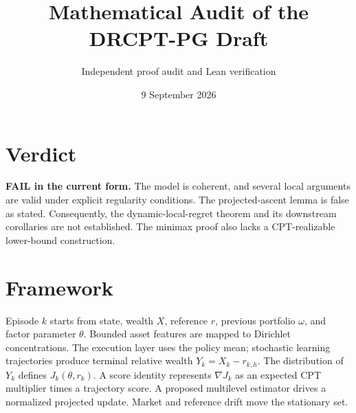 \documentclass[11pt]{article}
\title{Mathematical Audit of the DRCPT-PG Draft}
\author{Independent proof audit and Lean verification}
\date{9 September 2026}
\begin{document}
\maketitle

\section*{Verdict}
\textcolor{fatal}{\textbf{FAIL in the current form.}}
The model is coherent, and several local arguments are valid under explicit regularity conditions. The projected-ascent lemma is false as stated. Consequently, the dynamic-local-regret theorem and its downstream corollaries are not established. The minimax proof also lacks a CPT-realizable lower-bound construction.

\section*{Framework}
Episode $k$ starts from state, wealth $X$, reference $r$, previous portfolio $\omega$, and factor parameter $\theta$. Bounded asset features are mapped to Dirichlet concentrations. The execution layer uses the policy mean; stochastic learning trajectories produce terminal relative wealth $Y_k=X_k-r_{k,h}$. The distribution of $Y_k$ defines $J_k(\theta,r_k)$. A score identity represents $\nabla J_k$ as an expected CPT multiplier times a trajectory score. A proposed multilevel estimator drives a normalized projected update. Market and reference drift move the stationary set.
\end{document}
